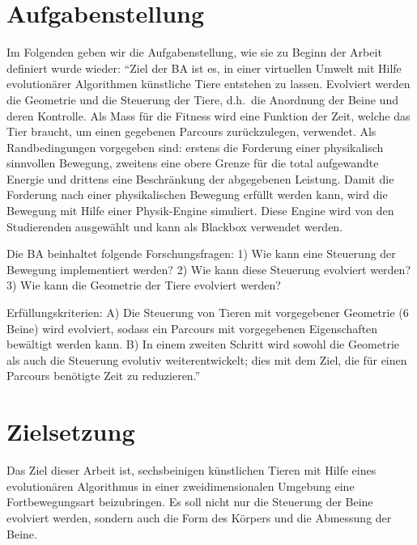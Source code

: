   \section{Aufgabenstellung}

    Im Folgenden geben wir die Aufgabenstellung, wie sie zu Beginn der Arbeit definiert wurde wieder:
    ``Ziel der BA ist es,
    in einer virtuellen Umwelt mit Hilfe evolutionärer Algorithmen künstliche Tiere entstehen zu lassen.
    Evolviert werden die Geometrie und die Steuerung der Tiere,
    d.h.\ die Anordnung der Beine und deren Kontrolle.
    Als Mass für die Fitness wird eine Funktion der Zeit, welche das Tier braucht,
    um einen gegebenen Parcours zurückzulegen, verwendet.
    Als Randbedingungen vorgegeben sind: erstens die Forderung einer physikalisch sinnvollen Bewegung,
    zweitens eine obere Grenze für die total aufgewandte Energie und drittens eine Beschränkung der abgegebenen Leistung.
    Damit die Forderung nach einer physikalischen Bewegung erfüllt werden kann,
    wird die Bewegung mit Hilfe einer Physik-Engine simuliert.
    Diese Engine wird von den Studierenden ausgewählt und kann als Blackbox verwendet werden.

    \medskip

    Die BA beinhaltet folgende Forschungsfragen: 1) Wie kann eine Steuerung der Bewegung implementiert werden?
    2) Wie kann diese Steuerung evolviert werden? 3) Wie kann die Geometrie der Tiere evolviert werden?

    \medskip

    Erfüllungskriterien: A) Die Steuerung von Tieren mit vorgegebener Geometrie (6 Beine) wird evolviert,
    sodass ein Parcours mit vorgegebenen Eigenschaften bewältigt werden kann.
    B) In einem zweiten Schritt wird sowohl die Geometrie als auch die Steuerung evolutiv weiterentwickelt;
    dies mit dem Ziel, die für einen Parcours benötigte Zeit zu reduzieren.''~\cite{Task}

  \section{Zielsetzung}

    Das Ziel dieser Arbeit ist, sechsbeinigen künstlichen Tieren mit Hilfe eines evolutionären Algorithmus
    in einer zweidimensionalen Umgebung eine Fortbewegungsart beizubringen.
    Es soll nicht nur die Steuerung der Beine evolviert werden,
    sondern auch die Form des Körpers und die Abmessung der Beine.

    \medskip

